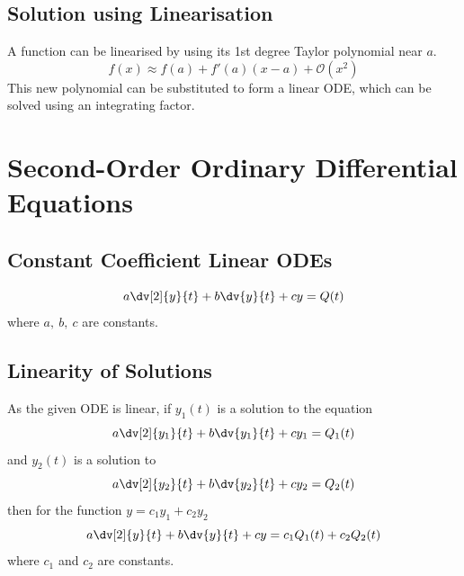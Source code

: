 \documentclass{article}
\begin{document}
\subsection{Solution using Linearisation}
A function can be linearised by using its 1st degree Taylor polynomial near \(a\).
\begin{equation*}
    f(x) \approx f(a) + f'(a)(x-a) + \mathcal{O}(x^2)
\end{equation*}
This new polynomial can be substituted to form a linear ODE, which can be solved using an integrating factor.
\newpage
\section{Second-Order Ordinary Differential Equations}
\subsection{Constant Coefficient Linear ODEs}
\begin{equation*}
    a \dv[2]{y}{t} + b \dv{y}{t} + c y = Q(t)
\end{equation*}
where \(a,\:b,\:c\) are constants.
\subsection{Linearity of Solutions}
\begin{theorem}\label{theorem:superposition}
    As the given ODE is linear, if \(y_1(t)\) is a solution to the equation
    \begin{equation*}
        a \dv[2]{y_1}{t} + b \dv{y_1}{t} + cy_1 = Q_1(t)
    \end{equation*}
    and \(y_2(t)\) is a solution to
    \begin{equation*}
        a \dv[2]{y_2}{t} + b \dv{y_2}{t} + cy_2 = Q_2(t)
    \end{equation*}
    then for the function \(y = c_1y_1+c_2y_2\)
    \begin{equation*}
        a \dv[2]{y}{t} + b \dv{y}{t} + cy = c_1Q_1(t) + c_2Q_2(t)
    \end{equation*}
    where \(c_1\) and \(c_2\) are constants.
\end{theorem}
\end{document}
